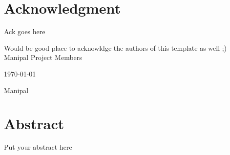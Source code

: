 \documentclass{mainreport}
\begin{document}
\maketitle
\makecertificate

\parindent 10mm
\chapter*{Acknowledgment}\label{ack}
{\label{ack} 

Ack goes here

Would be good place to acknowldge the authors of this template as well ;) \\[2cm]




\noindent Manipal \hfill Project Members

\noindent \today \hfill \institutename

 \hfill Manipal





}

\chapter*{Abstract}\label{Abstract}

{
\label{Abstract}



\hspace{6mm}	Put your abstract here
}

\tableofcontents


%

%

\listoffigures
{}
{}
\end{document}

